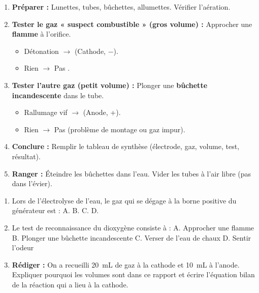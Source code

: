 \documentclass[11pt]{article}
\newcommand{\cle}[1]{{\popxbold\color{popdark}#1}}
\begin{document}
\begin{methode}
\begin{enumerate}
    \item \textbf{Préparer :} Lunettes, tubes, bûchettes, allumettes. Vérifier l'aération.
    \item \textbf{Tester le gaz « suspect combustible » (gros volume) :} Approcher une \textbf{flamme} à l'orifice. \begin{itemize} \item Détonation $\rightarrow$  (Cathode, \cle{−}). \item Rien $\rightarrow$ Pas .
    \end{itemize}
    \item \textbf{Tester l'autre gaz (petit volume) :} Plonger une \textbf{bûchette incandescente} dans le tube. \begin{itemize} \item Rallumage vif $\rightarrow$  (Anode, \cle{+}). \item Rien $\rightarrow$ Pas  (problème de montage ou gaz impur).
    \end{itemize}
    \item \textbf{Conclure :} Remplir le tableau de synthèse (électrode, gaz, volume, test, résultat).
    \item \textbf{Ranger :} Éteindre les bûchettes dans l'eau. Vider les tubes à l'air libre (pas dans l'évier).
\end{enumerate}
\end{methode}

\begin{exercice}
\begin{enumerate}
    \item Lors de l'électrolyse de l'eau, le gaz qui se dégage à la borne positive du générateur est : \quad A.  \quad B.  \quad C.  \quad D. 
    \item Le test de reconnaissance du dioxygène consiste à : \quad A. Approcher une flamme \quad B. Plonger une bûchette incandescente \quad C. Verser de l'eau de chaux \quad D. Sentir l'odeur
    \item \textbf{Rédiger :} On a recueilli \SI{20}{mL} de gaz à la cathode et \SI{10}{mL} à l'anode. Expliquer pourquoi les volumes sont dans ce rapport et écrire l'équation bilan de la réaction qui a lieu à la cathode.
\end{enumerate}
\end{exercice}
\end{document}
